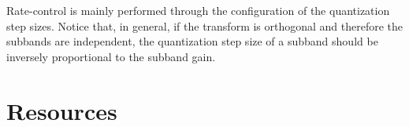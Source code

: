 Rate-control is mainly performed through the configuration of the
quantization step sizes. Notice that, in general, if the transform is
orthogonal and therefore the subbands are independent, the
quantization step size of a subband should be inversely proportional
to the subband gain.


\section{Resources}


